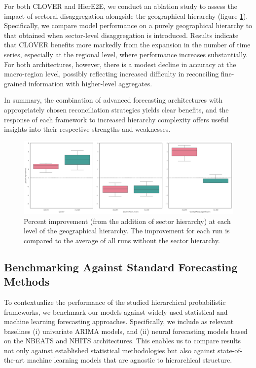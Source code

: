 \documentclass[letterpaper]{article}
\begin{document}
For both CLOVER and HierE2E, we conduct an ablation study to assess the impact of sectoral disaggregation alongside the geographical hierarchy (figure \ref{fig:improvement}). Specifically, we compare model performance on a purely geographical hierarchy to that obtained when sector-level disaggregation is introduced. Results indicate that CLOVER benefits more markedly from the expansion in the number of time series, especially at the regional level, where performance increases substantially. For both architectures, however, there is a modest decline in accuracy at the macro-region level, possibly reflecting increased difficulty in reconciling fine-grained information with higher-level aggregates.

In summary, the combination of advanced forecasting architectures with appropriately chosen reconciliation strategies yields clear benefits, and the response of each framework to increased hierarchy complexity offers useful insights into their respective strengths and weaknesses.

\begin{figure}
    \centering
    \includegraphics[width=\linewidth]{pct_improvement_sector.png}
    \caption{Percent improvement (from the addition of sector hierarchy) at each level of the geographical hierarchy. The improvement for each run is compared to the average of all runs without the sector hierarchy.}
    \label{fig:improvement}
\end{figure}


\subsection{Benchmarking Against Standard Forecasting Methods}

To contextualize the performance of the studied hierarchical probabilistic frameworks, we benchmark our models against widely used statistical and machine learning forecasting approaches. Specifically, we include as relevant baselines (i) univariate ARIMA models, and (ii) neural forecasting models based on the NBEATS and NHITS architectures. This enables us to compare results not only against established statistical methodologies but also against state-of-the-art machine learning models that are agnostic to hierarchical structure.
\end{document}
